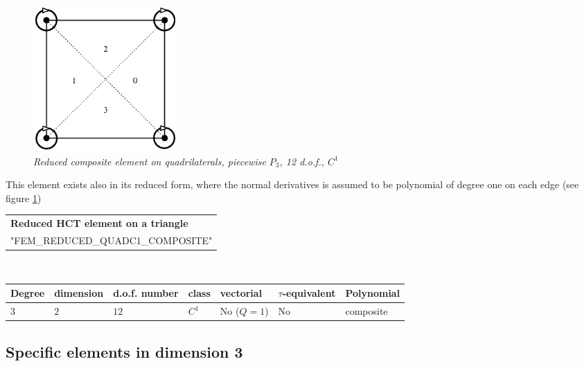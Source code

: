 \documentclass[10pt,a4paper]{article}
\begin{document}
\begin{figure}[H]
  \begin{center}
    \includegraphics[width=5.5cm,angle=0]{getfemlist_reduced_quadc1_composite.eps}
  \end{center}
  \caption{ \it Reduced composite element on quadrilaterals, piecewise $P_3$, 12 d.o.f., $C^1$}
  \label{fig:reduced_QC1_tr}
\end{figure}

This element exists also in its reduced form, where the normal derivatives is assumed to be polynomial of degree one on each edge (see figure \ref{fig:reduced_QC1_tr})


\begin{center}
\begin{tabular}{|m{16.11cm}|} \hline 
{ \bf Reduced HCT element on a triangle}\\
"FEM\_REDUCED\_QUADC1\_COMPOSITE"
\end{tabular} \\ \vspace{-1pt} 
\begin{tabular}{|m{2cm}|m{2cm}|m{2.5cm}|m{1.2cm}|m{2cm}|m{2cm}|m{1.8cm}|} \hline 
Degree & dimension & d.o.f. number & class & vectorial & \mbox{$\tau$-equivalent} & Polynomial \\ \hline
$3$ & $2$ & $12$ & $C^1$ & No \mbox{($Q = 1$)} & No & composite\\ \hline
\end{tabular}
\end{center}





\subsection{Specific elements in dimension 3}
\end{document}
